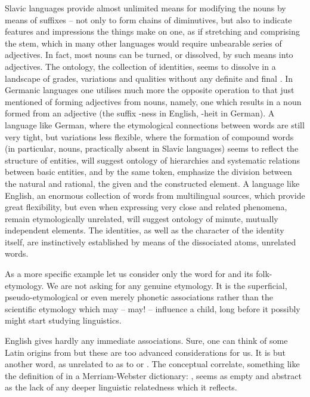\pa Slavic languages provide almost unlimited means for modifying the nouns by
means of suffixes -- not only to form chains of diminutives, but also to
indicate features and impressions the things make on one, as if stretching and
comprising the stem, which in many other languages would require unbearable series of
adjectives. In
fact, most nouns can be turned, or dissolved, by such means into adjectives. The
ontology, the collection of identities, seems to dissolve in a landscape of
grades, variations and qualities without any definite and final
.  In Germanic languages one utilises much more the opposite
operation to that just mentioned of forming adjectives from nouns, namely, one
which results in a noun formed from an adjective (the suffix -ness in English,
-heit in German).  A language like German, where the etymological connections
between words are still very tight, but variations less flexible, where the
formation of compound words (in particular, nouns, practically absent in Slavic
languages) seems to reflect the structure of entities, will suggest ontology of
hierarchies and systematic relations between basic entities, and by the same
token, emphasize the division between the natural and rational, the given and
the constructed element.  A language like English, an enormous collection of
words from multilingual sources, which provide great flexibility, but even when
expressing very close and related phenomena, remain etymologically unrelated,
will suggest ontology of minute, mutually independent elements. The
identities, as well as the character of the identity itself, are instinctively
established by means of the dissociated atoms, unrelated words.

As a more specific example let us consider only the word for  and its
folk-etymology. We are not asking for any genuine etymology. It is the
superficial, pseudo-etymological or even merely phonetic associations rather
than the scientific etymology which may -- may!  -- influence a child, long
before it possibly might start studying linguistics.

English  gives hardly any immediate associations.  Sure, one can
think of some Latin origins from  but these are too advanced
considerations for us. It is but another word, as unrelated to  as to
 or .  The conceptual correlate, something like
the definition of  in a Merriam-Webster dictionary: , seems as empty and
abstract as the lack of any deeper linguistic relatedness which it reflects.


